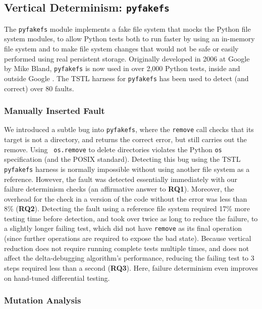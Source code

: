 {\subsection {Vertical Determinism: {\tt pyfakefs}}

The {\tt pyfakefs} \cite{pyfakefs} module implements a fake file
system that mocks the Python file system modules, to allow Python
tests both to run faster by using an in-memory file system and to make
file system changes that would not be safe or easily performed using
real persistent storage.  Originally developed in 2006 at Google by
Mike Bland, {\tt pyfakefs} is now used in over 2,000 Python tests,
inside and outside Google \cite{pyfakefs}.
The TSTL harness for {\tt pyfakefs} has been used to detect (and
correct) over 80 faults.

\subsubsection{Manually Inserted Fault}

We introduced a subtle bug into {\tt pyfakefs}, where the {\tt remove}
call checks that its target is not a directory, and returns the
correct error, but still carries out the remove.  Using {\tt
  os.remove} to delete directories violates the Python {\tt os}
specification (and the POSIX standard).  Detecting this bug using the TSTL
{\tt pyfakefs} harness is normally impossible without using another
file system as a reference.  However, the fault was detected  essentially
immediately with our failure determinism checks (an affirmative answer
to {\bf RQ1}).  Moreover, the overhead for the check in a
version of the code without the error was
less than 8\%  ({\bf RQ2}).  Detecting the fault using a reference file system 
required 17\% more testing time before detection, and took over twice as
long to reduce the failure, to a
slightly longer failing test, which did not have {\tt remove} as its
final operation (since further operations are required to 
expose the bad state).
Because vertical
reduction does not require running complete tests multiple times, and
does not affect the delta-debugging algorithm's performance, reducing
the failing test to 3 steps required less than a second ({\bf RQ3}).
Here, failure determinism even improves on hand-tuned differential testing.

\subsubsection{Mutation Analysis}

}
